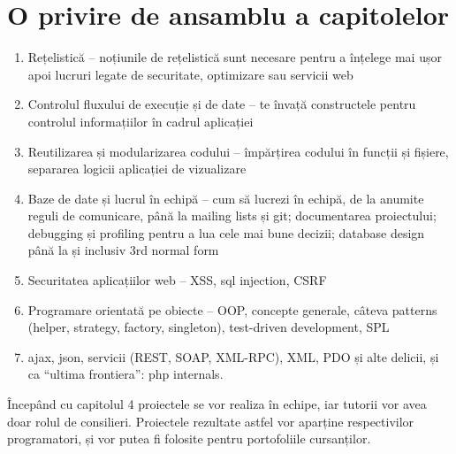 \section*{O privire de ansamblu a capitolelor}
{}

\begin{enumerate}
\item Rețelistică -- noțiunile de rețelistică sunt necesare pentru a înțelege mai
ușor apoi lucruri legate de securitate, optimizare sau servicii web
\item Controlul fluxului de execuție și de date -- te învață constructele pentru
controlul informațiilor în cadrul aplicației
\item Reutilizarea și modularizarea codului -- împărțirea codului în funcții și
fișiere, separarea logicii aplicației de vizualizare
\item Baze de date și lucrul în echipă -- cum să lucrezi în echipă, de la anumite
reguli de comunicare, până la mailing lists și git; documentarea proiectului;
debugging și profiling pentru a lua cele mai bune decizii; database design până
la și inclusiv 3rd normal form
\item Securitatea aplicațiilor web -- XSS, sql injection, CSRF
\item Programare orientată pe obiecte -- OOP, concepte generale, câteva patterns
(helper, strategy, factory, singleton), test-driven development, SPL
\item ajax, json, servicii (REST, SOAP, XML-RPC), XML, PDO și alte delicii, și ca
``ultima frontiera'': php internals.
\end{enumerate}

Începând cu capitolul 4 proiectele se vor realiza în echipe, iar tutorii vor avea
doar rolul de consilieri. Proiectele rezultate astfel vor aparține respectivilor
programatori, și vor putea fi folosite pentru portofoliile cursanților.

